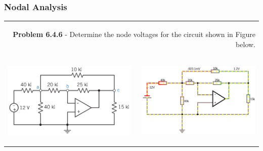 \documentclass[aspectratio=169]{beamer}
\begin{document}
\begin{frame}[fragile]
\frametitle{Nodal Analysis}
\begin{tabular}{r}


\begin{columns}
		\begin{column}{1\textwidth}  %
		 \textbf{Problem 6.4.6} - Determine the node voltages for the circuit shown in Figure below. \newline
		\end{column}
  \end{columns}\\

    \begin{columns}
		\begin{column}{.5\textwidth}  %
		
    			\includegraphics[height=.6\textwidth]{figura14.png}
    			
		\end{column}
		\begin{column}{.5\textwidth}  %
		
    			
    			\includegraphics[height=.6\textwidth]{figura30.png}
    			

\end{column}
\end{columns}
\end{tabular}
\end{frame}
\end{document}
